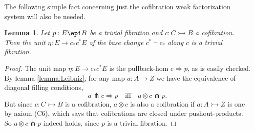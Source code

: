 \documentclass[12pt]{article}
\newcommand{\mono}{\ensuremath{\rightarrowtail}}
\newcommand{\ra}{\ensuremath{\rightarrow}}
\newtheorem{lemma}[theorem]{Lemma}
\theoremstyle{remark}
\theoremstyle{definition}
\begin{document}
The following simple fact concerning just the cofibration weak factorization system will also be needed.

\begin{lemma}\label{lemma:etaTF}
Let $p: E \epi B$ be a trivial fibration and $c : C\mono B$ a cofibration.  Then the unit $\eta:E \ra c_*c^*E$ of the base change $c^*\dashv c_*$ along $c$ is a trivial fibration.
\end{lemma}

\begin{proof}
The unit map $\eta:E \ra c_*c^*E$ is the pullback-hom $c\!\Rightarrow\! p$, as is easily checked.
By lemma \ref{lemma:Leibniz}, for any map $a : A \to Z$ we have the equivalence of diagonal filling conditions,
\[
a \pitchfork c\!\Rightarrow\!p  \quad\text{iff}\quad a\!\otimes\!c \pitchfork p.
\]
But since $c : C\mono B$ is a cofibration, $a\otimes c$ is also a cofibration if $a : A \mono Z$ is one by axiom (C6), which says that cofibrations are closed under pushout-products.  So $a\otimes c \pitchfork p$ indeed holds, since $p$ is a trivial fibration.
\end{proof}
\end{document}
